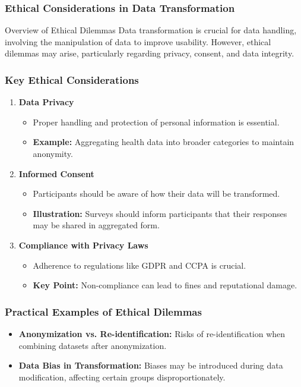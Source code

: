 \documentclass[aspectratio=169]{beamer}
\begin{document}
\begin{frame}[fragile]
    \frametitle{Ethical Considerations in Data Transformation}
    \begin{block}{Overview of Ethical Dilemmas}
        Data transformation is crucial for data handling, involving the manipulation of data to improve usability. However, ethical dilemmas may arise, particularly regarding privacy, consent, and data integrity.
    \end{block}
\end{frame}

\begin{frame}[fragile]
    \frametitle{Key Ethical Considerations}
    \begin{enumerate}
        \item \textbf{Data Privacy}
            \begin{itemize}
                \item Proper handling and protection of personal information is essential.
                \item \textbf{Example:} Aggregating health data into broader categories to maintain anonymity.
            \end{itemize}
        
        \item \textbf{Informed Consent}
            \begin{itemize}
                \item Participants should be aware of how their data will be transformed.
                \item \textbf{Illustration:} Surveys should inform participants that their responses may be shared in aggregated form.
            \end{itemize}
        
        \item \textbf{Compliance with Privacy Laws}
            \begin{itemize}
                \item Adherence to regulations like GDPR and CCPA is crucial.
                \item \textbf{Key Point:} Non-compliance can lead to fines and reputational damage.
            \end{itemize}
    \end{enumerate}
\end{frame}

\begin{frame}[fragile]
    \frametitle{Practical Examples of Ethical Dilemmas}
    \begin{itemize}
        \item \textbf{Anonymization vs. Re-identification:} Risks of re-identification when combining datasets after anonymization.
        \item \textbf{Data Bias in Transformation:} Biases may be introduced during data modification, affecting certain groups disproportionately.
    \end{itemize}
\end{frame}
\end{document}
